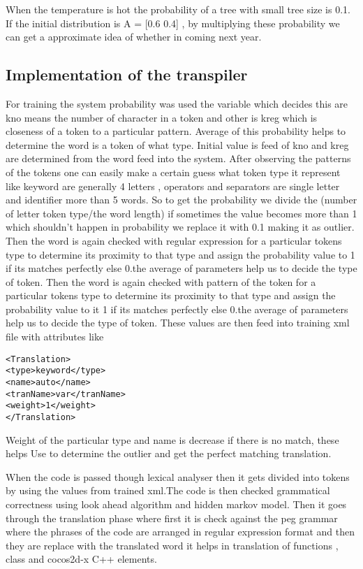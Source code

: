 \documentclass[23pt]{article}
\begin{document}
{\Large When the temperature is hot the probability of a tree with small tree size is 0.1.
If the initial distribution is A = [0.6 0.4] , by multiplying these probability we can get a approximate idea of whether in coming next year. \par}

\subsection{Implementation of the transpiler}

{\Large For training the system probability was used the variable which decides this are kno means the number of character in a token and other is kreg which is closeness of a token to a particular pattern. Average of this probability helps to determine the word is a token of what type. Initial value is feed of kno and kreg are determined from the word feed into the system. After observing the patterns of the tokens one can easily make a certain guess what token type it represent like keyword are generally 4 letters , operators and separators are single letter and identifier more than 5 words. So to get the probability we divide the (number of letter token type/the word length) if sometimes the value becomes more than 1 which shouldn’t happen in probability we replace it with 0.1 making it as outlier. Then the word is again checked with regular expression for a particular tokens type to determine its proximity to that type and assign the probability value to  1 if its matches perfectly else 0.the average of parameters help us to decide the type of token. Then the word is again checked with pattern of the token for a particular tokens type to determine its proximity to that type and assign the probability value to it 1 if its matches perfectly else 0.the average of parameters help us to decide the type of token. These values are then feed into training xml file with attributes like 
\begin{lstlisting}[label=some-code,caption= xml structure for training]
<Translation> 
<type>keyword</type> 
<name>auto</name> 
<tranName>var</tranName> 
<weight>1</weight> 
</Translation>
\end{lstlisting}

Weight of the particular type and name is decrease if there is no match, these helps
Use to determine the outlier and get the perfect matching translation. 

When the code is passed though lexical analyser then it gets divided into tokens by using the values from trained xml.The code is then checked grammatical correctness using look ahead algorithm and hidden markov model. Then it goes through the translation phase where first it is check against the peg grammar where the phrases of the code are arranged in regular expression format and then they are replace with the translated word it helps in translation of functions , class and cocos2d-x C++ elements.  \\ \par}
\end{document}
